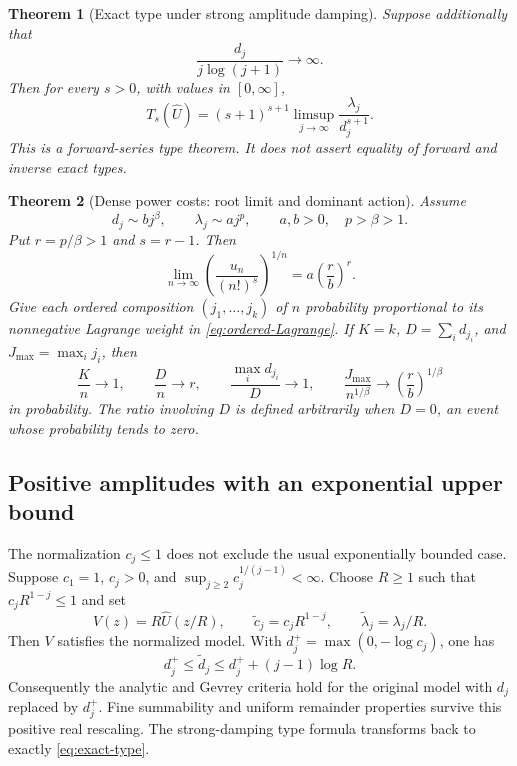 \documentclass[11pt,a4paper]{article}
\numberwithin{equation}{section}
\newtheorem{theorem}{Theorem}[section]
\theoremstyle{definition}
\theoremstyle{remark}
\theoremstyle{definition}
\newcommand{\U}{\widehat U}
\begin{document}
\begin{theorem}[Exact type under strong amplitude damping]
\label{thm:type}
Suppose additionally that
\begin{equation}
 \frac{d_j}{j\log(j+1)}\longrightarrow\infty.
 \label{eq:strong}
\end{equation}
Then for every $s>0$, with values in $[0,\infty]$,
\begin{equation}
 \boxed{\quad
 T_s(\U)=(s+1)^{s+1}
       \limsup_{j\to\infty}\frac{\lambda_j}{d_j^{s+1}}.
 \quad}
 \label{eq:exact-type}
\end{equation}
This is a forward-series type theorem. It does not assert equality of
forward and inverse exact types.
\end{theorem}

\begin{theorem}[Dense power costs: root limit and dominant action]
\label{thm:condensation}
Assume
\begin{equation}
 d_j\sim b j^\beta,\qquad \lambda_j\sim a j^p,
 \qquad a,b>0,\quad p>\beta>1.
 \label{eq:powers}
\end{equation}
Put $r=p/\beta>1$ and $s=r-1$. Then
\begin{equation}
 \lim_{n\to\infty}\left(\frac{u_n}{(n!)^s}\right)^{1/n}
     =a\left(\frac r b\right)^r.
 \label{eq:root-limit}
\end{equation}
Give each ordered composition $(j_1,\ldots,j_k)$ of $n$ probability
proportional to its nonnegative Lagrange weight in
\eqref{eq:ordered-Lagrange}. If $K=k$, $D=\sum_i d_{j_i}$, and
$J_{\max}=\max_i j_i$, then
\begin{equation}
 \frac K n\to1,\qquad \frac D n\to r,\qquad
 \frac{\max_i d_{j_i}}{D}\to1,\qquad
 \frac{J_{\max}}{n^{1/\beta}}\to\left(\frac r b\right)^{1/\beta}
 \label{eq:prob-limits}
\end{equation}
in probability. The ratio involving $D$ is defined arbitrarily when
$D=0$, an event whose probability tends to zero.
\end{theorem}

\subsection{Positive amplitudes with an exponential upper bound}
The normalization $c_j\le1$ does not exclude the usual exponentially
bounded case. Suppose $c_1=1$, $c_j>0$, and
$\sup_{j\ge2}c_j^{1/(j-1)}<\infty$. Choose $R\ge1$ such that
$c_jR^{1-j}\le1$ and set
\begin{equation}
 V(z)=R\U(z/R),\qquad
 \widetilde c_j=c_jR^{1-j},\qquad
 \widetilde\lambda_j=\lambda_j/R.
 \label{eq:rescaling}
\end{equation}
Then $V$ satisfies the normalized model. With
$d_j^+=\max(0,-\log c_j)$, one has
\[
 d_j^+\le\widetilde d_j\le d_j^++(j-1)\log R.
\]
Consequently the analytic and Gevrey criteria hold for the original model
with $d_j$ replaced by $d_j^+$. Fine summability and uniform remainder
properties survive this positive real rescaling. The strong-damping
type formula transforms back to exactly \eqref{eq:exact-type}.
\end{document}
